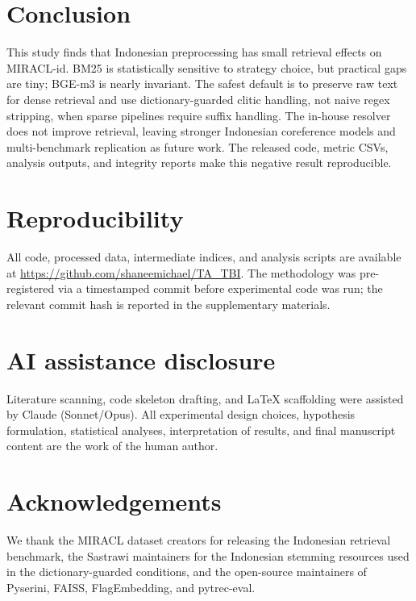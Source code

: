 \section{Conclusion}
\label{sec:conclusion}

This study finds that Indonesian  preprocessing has small retrieval effects on MIRACL-id. BM25 is statistically sensitive to strategy choice, but practical gaps are tiny; BGE-m3 is nearly invariant. The safest default is to preserve raw text for dense retrieval and use dictionary-guarded clitic handling, not naive regex stripping, when sparse pipelines require suffix handling. The in-house resolver does not improve retrieval, leaving stronger Indonesian coreference models and multi-benchmark replication as future work. The released code, metric CSVs, analysis outputs, and integrity reports make this negative result reproducible.

\section*{Reproducibility}

All code, processed data, intermediate indices, and analysis scripts are available at \url{https://github.com/shaneemichael/TA_TBI}. The methodology was pre-registered via a timestamped commit before experimental code was run; the relevant commit hash is reported in the supplementary materials.

\section*{AI assistance disclosure}

Literature scanning, code skeleton drafting, and LaTeX scaffolding were assisted by Claude (Sonnet/Opus). All experimental design choices, hypothesis formulation, statistical analyses, interpretation of results, and final manuscript content are the work of the human author.

\section*{Acknowledgements}

We thank the MIRACL dataset creators for releasing the Indonesian retrieval benchmark, the Sastrawi maintainers for the Indonesian stemming resources used in the dictionary-guarded conditions, and the open-source maintainers of Pyserini, FAISS, FlagEmbedding, and pytrec-eval.
